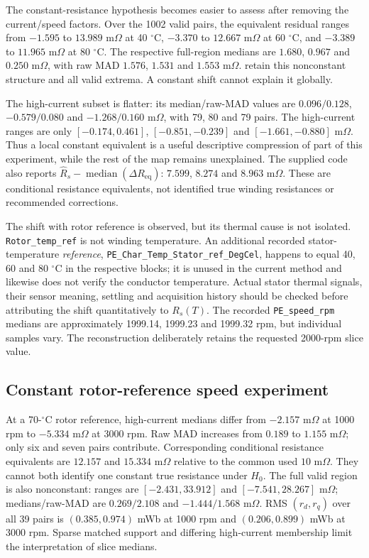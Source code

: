 The constant-resistance hypothesis becomes easier to assess after removing
the current/speed factors. Over the 1002 valid pairs,
the equivalent residual ranges from $-1.595$ to $13.989$ m$\Omega$ at
40 $^\circ$C, $-3.370$ to $12.667$ m$\Omega$ at 60 $^\circ$C, and
$-3.389$ to $11.965$ m$\Omega$ at 80 $^\circ$C.
The respective full-region medians are $1.680$, $0.967$ and
$0.250$ m$\Omega$, with raw MAD $1.576$, $1.531$ and $1.553$ m$\Omega$.
 retain this nonconstant
structure and all valid extrema. A constant shift cannot explain it globally.



The high-current subset is flatter: its median/raw-MAD values are
$0.096/0.128$, $-0.579/0.080$ and $-1.268/0.160$ m$\Omega$, with
79, 80 and 79 pairs. The high-current ranges are only
$[-0.174,0.461]$, $[-0.851,-0.239]$ and $[-1.661,-0.880]$ m$\Omega$.
Thus a local constant equivalent is a useful descriptive compression of
part of this experiment, while the rest of the map remains unexplained.
The supplied code also reports $\hat R_s-\operatorname{median}
(\Delta R_{\mathrm{eq}})$: $7.599$, $8.274$ and $8.963$ m$\Omega$.
These are conditional resistance equivalents, not identified true winding
resistances or recommended corrections.

The shift with rotor reference is observed, but its thermal cause is not
isolated. \texttt{Rotor\_temp\_ref} is not winding temperature. An additional
recorded stator-temperature \emph{reference},
\texttt{PE\_Char\_\allowbreak Temp\_Stator\_\allowbreak ref\_DegCel}, happens to equal 40, 60 and
80 $^\circ$C in the respective blocks; it is unused in the current method
and likewise does not verify the conductor temperature. Actual stator thermal
signals, their sensor meaning, settling and acquisition history should be
checked before attributing the shift quantitatively to $R_s(T)$.
The recorded \texttt{PE\_speed\_rpm} medians are approximately 1999.14,
1999.23 and 1999.32 rpm, but individual samples vary. The reconstruction
deliberately retains the requested 2000-rpm slice value.

\subsection{Constant rotor-reference speed experiment}
At a 70-$^\circ$C rotor reference, high-current medians differ from
$-2.157$ m$\Omega$ at 1000 rpm to $-5.334$ m$\Omega$ at 3000 rpm.
Raw MAD increases from $0.189$ to $1.155$ m$\Omega$; only six and seven
pairs contribute. Corresponding conditional resistance equivalents are
$12.157$ and $15.334$ m$\Omega$ relative to the common used
$10$ m$\Omega$. They cannot both identify one constant true resistance
under $H_0$.
The full valid region is also nonconstant: ranges are
$[-2.431,33.912]$ and $[-7.541,28.267]$ m$\Omega$;
medians/raw-MAD are $0.269/2.108$ and $-1.444/1.568$ m$\Omega$.
RMS $(r_d,r_q)$ over all 39 pairs is $(0.385,0.974)$ mWb at 1000 rpm
and $(0.206,0.899)$ mWb at 3000 rpm. Sparse matched support and differing
high-current membership limit the interpretation of slice medians.


